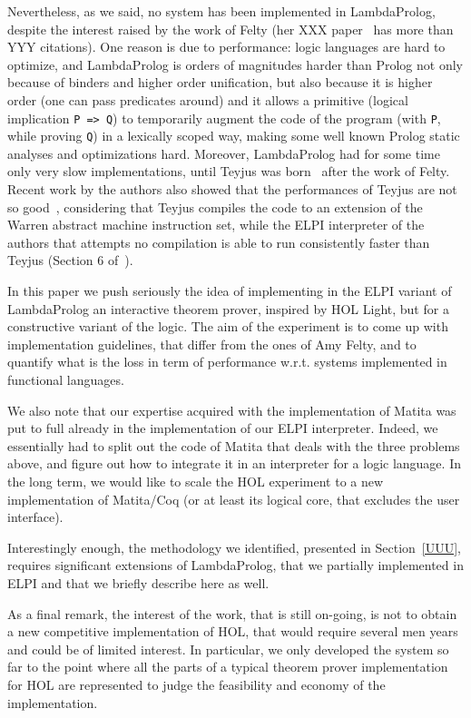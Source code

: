 \documentclass[preprint]{sigplanconf}
\begin{document}
Nevertheless, as we said, no system has been implemented in LambdaProlog, despite the interest raised by the work of Felty (her XXX paper~\cite{amy4} has more than YYY citations). One reason is due to performance: logic languages are hard to optimize, and LambdaProlog is orders of magnitudes harder than Prolog not only because of binders and higher order unification, but also because it is higher order (one can pass predicates around) and it allows a primitive (logical implication \texttt{P => Q}) to temporarily augment the code of the program (with \texttt{P}, while proving \texttt{Q}) in a lexically scoped way, making some well known Prolog static analyses and optimizations hard. Moreover, LambdaProlog had for some time only very slow implementations, until Teyjus was born~\cite{teyjus1} after the work of Felty. Recent work by the authors also showed that the performances of Teyjus are not so good~\cite{elpi1}, considering that Teyjus compiles the code to an extension of the Warren abstract machine instruction set, while the ELPI interpreter of the authors that attempts no compilation is able to run consistently faster than Teyjus (Section 6 of~\cite{elpi1}).

In this paper we push seriously the idea of implementing in the ELPI variant of LambdaProlog an interactive theorem prover, inspired by HOL Light, but for a constructive variant of the logic. The aim of the experiment is to come up with implementation guidelines, that differ from the ones of Amy Felty, and to quantify what is the loss in term of performance w.r.t. systems implemented in functional languages.

We also note that our expertise acquired with the implementation of Matita was put to full already in the implementation of our ELPI interpreter. Indeed, we essentially had to split out the code of Matita that deals with the three problems above, and figure out how to integrate it in an interpreter for a logic language. In the long term, we would like to scale the HOL experiment to a new implementation of Matita/Coq (or at least its logical core, that excludes the user interface).

Interestingly enough, the methodology we identified, presented in Section~\ref{UUU}, requires significant extensions of LambdaProlog, that we partially implemented in ELPI and that we briefly describe here as well.

As a final remark, the interest of the work, that is still on-going, is not to obtain a new competitive implementation of HOL, that would require several men years and could be of limited interest. In particular, we only developed the system so far to the point where all the parts of a typical theorem prover implementation for HOL are represented to judge the feasibility and economy of the implementation.
\end{document}
